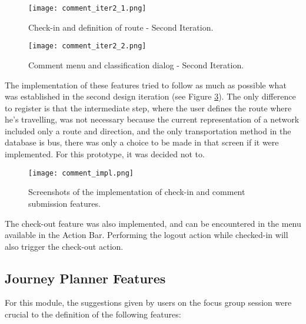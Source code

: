 \begin{figure}[h!]
  \begin{center}
    \leavevmode
    \texttt{[image: comment\_iter2\_1.png]}
    \caption{Check-in and definition of route - Second Iteration.}
    \label{fig:comment_iter2_1}
  \end{center}
\end{figure}

\begin{figure}[h!]
  \begin{center}
    \leavevmode
    \texttt{[image: comment\_iter2\_2.png]}
    \caption{Comment menu and classification dialog - Second Iteration.}
    \label{fig:comment_iter2_2}
  \end{center}
\end{figure}

\newpage

The implementation of these features tried to follow as much as possible what was established in the second design iteration (see Figure \ref{fig:comment_impl}). The only difference to register is that the intermediate step, where the user defines the route where he's travelling, was not necessary because the current representation of a network included only a route and direction, and the only transportation method in the database is bus, there was only a choice to be made in that screen if it were implemented. For this prototype, it was decided not to.

\begin{figure}[h!]
  \begin{center}
    \leavevmode
    \texttt{[image: comment\_impl.png]}
    \caption{Screenshots of the implementation of check-in and comment submission features.}
    \label{fig:comment_impl}
  \end{center}
\end{figure}

The check-out feature was also implemented, and can be encountered in the menu available in the Action Bar. Performing the logout action while checked-in will also trigger the check-out action.

\newpage

\subsection{Journey Planner Features}\label{journeyplanner}

For this module, the suggestions given by users on the focus group session were crucial to the definition of the following features:

